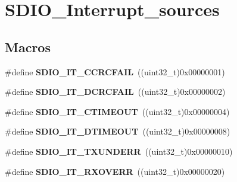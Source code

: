 \hypertarget{group___s_d_i_o___interrupt__sources}{\section{S\-D\-I\-O\-\_\-\-Interrupt\-\_\-sources}
\label{group___s_d_i_o___interrupt__sources}
}
\subsection*{Macros}
\begin{DoxyCompactItemize}
\item 
\hypertarget{group___s_d_i_o___interrupt__sources_gabb076105e18355a260c40a379511e72f}{\#define {\bfseries S\-D\-I\-O\-\_\-\-I\-T\-\_\-\-C\-C\-R\-C\-F\-A\-I\-L}~((uint32\-\_\-t)0x00000001)}\label{group___s_d_i_o___interrupt__sources_gabb076105e18355a260c40a379511e72f}

\item 
\hypertarget{group___s_d_i_o___interrupt__sources_gaf3321305cb4e24419185a4b92ead299a}{\#define {\bfseries S\-D\-I\-O\-\_\-\-I\-T\-\_\-\-D\-C\-R\-C\-F\-A\-I\-L}~((uint32\-\_\-t)0x00000002)}\label{group___s_d_i_o___interrupt__sources_gaf3321305cb4e24419185a4b92ead299a}

\item 
\hypertarget{group___s_d_i_o___interrupt__sources_ga3c2fdef0993f10e65d4fddbdf71febed}{\#define {\bfseries S\-D\-I\-O\-\_\-\-I\-T\-\_\-\-C\-T\-I\-M\-E\-O\-U\-T}~((uint32\-\_\-t)0x00000004)}\label{group___s_d_i_o___interrupt__sources_ga3c2fdef0993f10e65d4fddbdf71febed}

\item 
\hypertarget{group___s_d_i_o___interrupt__sources_gaf5ce4bfa8459ccbe892791e5cdc26a6f}{\#define {\bfseries S\-D\-I\-O\-\_\-\-I\-T\-\_\-\-D\-T\-I\-M\-E\-O\-U\-T}~((uint32\-\_\-t)0x00000008)}\label{group___s_d_i_o___interrupt__sources_gaf5ce4bfa8459ccbe892791e5cdc26a6f}

\item 
\hypertarget{group___s_d_i_o___interrupt__sources_ga93d4dbe3162b8507b2834a3e29e6c648}{\#define {\bfseries S\-D\-I\-O\-\_\-\-I\-T\-\_\-\-T\-X\-U\-N\-D\-E\-R\-R}~((uint32\-\_\-t)0x00000010)}\label{group___s_d_i_o___interrupt__sources_ga93d4dbe3162b8507b2834a3e29e6c648}

\item 
\hypertarget{group___s_d_i_o___interrupt__sources_ga272953292e1b43b2108b00e75db76512}{\#define {\bfseries S\-D\-I\-O\-\_\-\-I\-T\-\_\-\-R\-X\-O\-V\-E\-R\-R}~((uint32\-\_\-t)0x00000020)}\label{group___s_d_i_o___interrupt__sources_ga272953292e1b43b2108b00e75db76512}


\end{DoxyCompactItemize}
